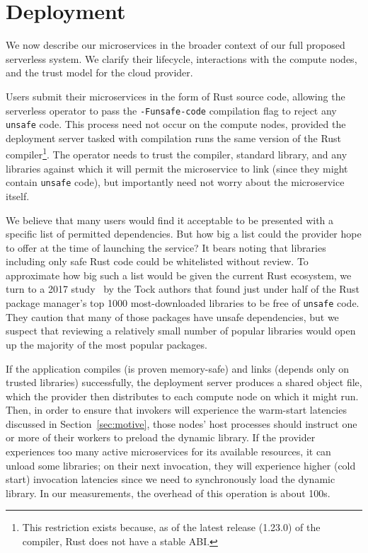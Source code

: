 \section{Deployment}
\label{sec:deploy}

We now describe our microservices in the broader context of our full proposed
serverless system.  We clarify their lifecycle, interactions with the compute nodes,
and the trust model for the cloud provider.

Users submit their microservices in the form of Rust source code, allowing the
serverless operator to pass the \texttt{-Funsafe-code} compilation flag to reject
any \texttt{unsafe} code.  This process need not occur on the compute
nodes, provided the deployment server tasked with compilation runs the same version
of the Rust compiler\footnote{This restriction exists because, as of the latest
release (1.23.0) of the compiler, Rust does not have a stable ABI.}.  The operator
needs to trust the compiler, standard library, and any libraries against which it
will permit the microservice to link (since they might contain \texttt{unsafe} code),
but importantly need not worry about the microservice itself.

We believe that many users would find it acceptable to be presented with a specific
list of permitted dependencies.  But how big a list could the provider hope to offer
at the time of launching the service?  It bears noting that libraries including only
safe Rust code could be whitelisted without review.  To approximate how big such a
list would be given the current Rust ecosystem, we turn to a 2017
study~\cite{www-cratesio-unsafe} by the Tock authors that found just under half of
the Rust package manager's top 1000 most-downloaded libraries to be free of
\texttt{unsafe} code.  They caution that many of those packages have unsafe
dependencies, but we suspect that reviewing a relatively small number of popular
libraries would open up the majority of the most popular packages.

If the application compiles (is proven memory-safe) and links (depends only on
trusted libraries) successfully, the deployment server produces a shared object file,
which the provider then distributes to each compute node on which it might run.
Then, in order to ensure that invokers will experience the warm-start latencies
discussed in Section~\ref{sec:motive}, those nodes' host processes should instruct
one or more of their workers to preload the dynamic library.  If the provider
experiences too many active microservices for its available resources, it can
unload some libraries; on their next invocation, they will experience higher
(cold start) invocation latencies since we need to synchronously load the dynamic
library.  In our measurements, the overhead of this operation is about 100\textmu{}s.
